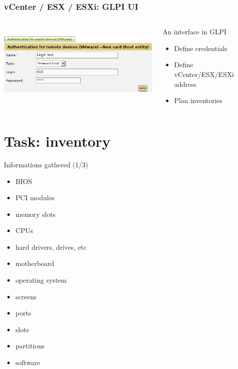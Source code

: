 \documentclass{beamer}
\begin{document}
\begin{frame}[fragile]
    \frametitle{vCenter / ESX / ESXi: GLPI UI}

 \begin{columns}
 \begin{column}[T]{4cm}
    \includegraphics[height=4.0cm]{pics/esx-glpi.jpg}
 \end{column}
 \begin{column}[t]{6cm}
    \begin{block}{An interface in GLPI}
    \begin{itemize}
         \item Define credentials
         \item Define vCenter/ESX/ESXi address
         \item Plan inventories
    \end{itemize}
    \end{block}
 \end{column}
\end{columns}




\end{frame}

\section{Task: inventory}

\begin{frame}
    \begin{block}{Informations gathered (1/3)}
        \begin{itemize}
        \item BIOS
        \item PCI modules
        \item memory slots
        \item CPUs
        \item hard drivers, drives, etc
        \item motherboard
        \item operating system
        \item screens
        \item ports
        \item slots
        \item partitions
        \item software
        \end{itemize}
    \end{block}
\end{frame}
\end{document}
